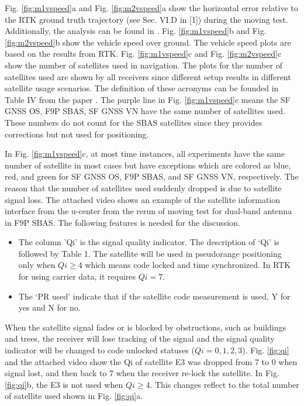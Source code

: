 \documentclass[letterpaper, 10 pt,onecolumn]{article}
\begin{document}
	Fig. \ref{fig:m1vspeed}a and Fig. \ref{fig:m2vspeed}a show the horizontal error relative to the RTK ground truth trajectory (see Sec. VI.D in [1]) during the moving test. Additionally, the analysis can be found in \cite{hu2021using}. Fig. \ref{fig:m1vspeed}b and Fig. \ref{fig:m2vspeed}b show the vehicle speed over ground. The vehicle speed plots are based on the results from RTK. 
	Fig. \ref{fig:m1vspeed}c and Fig. \ref{fig:m2vspeed}c show the number of satellites used in navigation. 
	The plots for the number of satellites used are shown by all receivers since different setup results in different satellite usage scenarios. 
	The definition of these acronyms can be founded in Table IV from the paper \cite{hu2021using}. The purple line in Fig. \ref{fig:m1vspeed}c means the SF GNSS OS, F9P SBAS, SF GNSS VN have the same number of satellites used. These numbers do not count for the SBAS satellites since they provides corrections but not used for positioning.
	
	In Fig. \ref{fig:m1vspeed}c, at most time instances, all experiments have the same number of satellite in most cases but have exceptions which are colored as blue, red, and green for SF GNSS OS, F9P SBAS, and SF GNSS VN, respectively. The reason that the number of satellites used suddenly dropped is due to satellite signal loss. The attached video shows an example of the satellite information interface from the u-center from the rerun of moving test for dual-band antenna in F9P SBAS. The following features is needed for the discussion. 
	\begin{itemize}
		\item The column 'Qi' is the signal quality indicator. The description of `Qi' is followed by Table 1. The satellite will be used in pseudorange positioning only when $Qi \geq 4$ which means code locked and time synchronized. In RTK for using carrier data, it requires $Qi = 7$.
		\item The `PR used' indicate that if the satellite code measurement is used, Y for yes and N for no.
	\end{itemize}
	
	When the satellite signal fades or is blocked by obstructions, such as buildings and trees, the receiver will lose tracking of the signal and the signal quality indicator will be changed to code unlocked statuses ($Qi = 0,1,2,3$). Fig. \ref{fig:qi} and the attached video show the Qi of satellite E3 was dropped from 7 to 0 when signal lost, and then back to 7 when the receiver re-lock the satellite. In Fig. \ref{fig:qi}b, the E3 is not used when $Qi \geq 4$. This changes reflect to the total number of satellite used shown in Fig. \ref{fig:qi}a.
	
\end{document}
